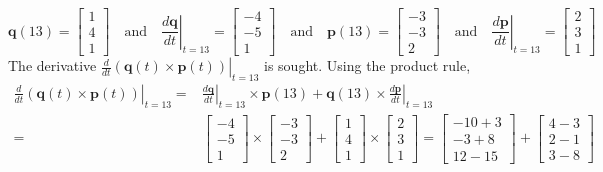 \documentclass{article}
\begin{document}
\begin{itemize}
\[\mathbf{q}(13) = \begin{bmatrix} 1 \\ 4 \\ 1 \end{bmatrix} \quad\text{and}\quad \left.\frac{d\mathbf{q}}{dt}\right|_{t = 13} = \begin{bmatrix} -4 \\ -5 \\ 1 \end{bmatrix} \quad\text{and}\quad \mathbf{p}(13) = \begin{bmatrix} -3 \\ -3 \\ 2 \end{bmatrix} \quad\text{and}\quad \left.\frac{d\mathbf{p}}{dt}\right|_{t = 13} = \begin{bmatrix} 2 \\ 3 \\ 1 \end{bmatrix}\]   
The derivative \(\left.\frac{d}{dt}(\mathbf{q}(t) \times \mathbf{p}(t))\right|_{t = 13}\) is sought. Using the product rule, 
\begin{align*}
\left.\frac{d}{dt}(\mathbf{q}(t) \times \mathbf{p}(t))\right|_{t = 13} = & \left.\frac{d\mathbf{q}}{dt}\right|_{t = 13} \times \mathbf{p}(13) + \mathbf{q}(13) \times \left.\frac{d\mathbf{p}}{dt}\right|_{t = 13} \\   
= & \begin{bmatrix} -4 \\ -5 \\ 1 \end{bmatrix} \times \begin{bmatrix} -3 \\ -3 \\ 2 \end{bmatrix} + \begin{bmatrix} 1 \\ 4 \\ 1 \end{bmatrix} \times \begin{bmatrix} 2 \\ 3 \\ 1 \end{bmatrix}  
= \begin{bmatrix} -10 + 3 \\ -3 + 8 \\ 12 - 15 \end{bmatrix} + \begin{bmatrix} 4 - 3 \\ 2 - 1 \\ 3 - 8 \end{bmatrix}  

\end{align*}
\end{itemize}
\end{document}
